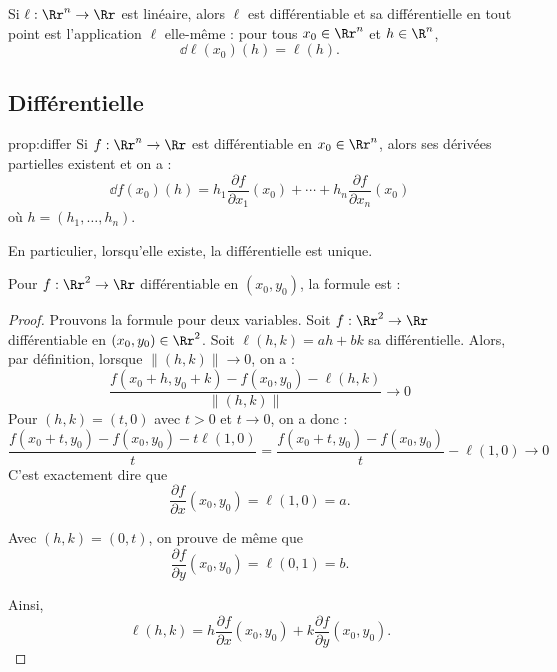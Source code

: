 \begin{exemple}{}{}
	Si $\ell : \Rr^n \to \Rr$ est linéaire, alors $\ell$ est différentiable et sa différentielle en tout point est l'application $\ell$ elle-même : pour tous $x_0 \in \Rr^n$ et $h \in \R^n$,
	$$
	\dd \ell (x_0) (h) = \ell(h).
	$$ 
\end{exemple}




\subsection{Différentielle}


\begin{proposition}{}{prop:differ}
	Si $f : \Rr^n \to \Rr$ est différentiable en $x_0 \in \Rr^n$, alors ses dérivées partielles existent et on a :
	$$
	\dd f(x_0)(h) = 
	h_1 \frac{\partial f}{\partial x_1}(x_0)  + \cdots + h_n \frac{\partial f}{\partial x_n}(x_0)  
	$$
	où $h = (h_1,\ldots,h_n)$.
\end{proposition}
En particulier, lorsqu'elle existe, la différentielle est unique.

\bigskip

Pour $f : \Rr^2 \to \Rr$ différentiable en $(x_0,y_0)$, la formule est :

\begin{proof}
	Prouvons la formule pour deux variables.
	Soit $f : \Rr^2 \to \Rr$ différentiable en $(x_0,y_0) \in \Rr^2$.
	Soit $\ell(h,k) = ah + bk$ sa différentielle. Alors, par définition, lorsque $\|(h,k)\| \to 0$, on a :
	$$\frac{f(x_0+ h,y_0+k) - f(x_0,y_0) - \ell(h,k)}{\|(h,k)\|} \longrightarrow 0$$
	Pour $(h,k) = (t,0)$ avec $t>0$ et $t \to 0$, on a donc :
	$$\frac{f(x_0+ t,y_0) - f(x_0,y_0) - t\ell(1,0)}{t}
	= \frac{f(x_0+ t,y_0) - f(x_0,y_0)}{t} - \ell(1,0) \longrightarrow  0$$
	C'est exactement dire que 
	$$\frac{\partial f}{\partial x}(x_0,y_0) = \ell(1,0) = a.$$
	
	Avec $(h,k) = (0,t)$, on prouve de même que 
	$$\frac{\partial f}{\partial y}(x_0,y_0) = \ell(0,1) = b.$$
	
	Ainsi,
	$$\ell(h,k) = h \frac{\partial f}{\partial x}(x_0,y_0) +
	k \frac{\partial f}{\partial y}(x_0,y_0).$$
\end{proof}




